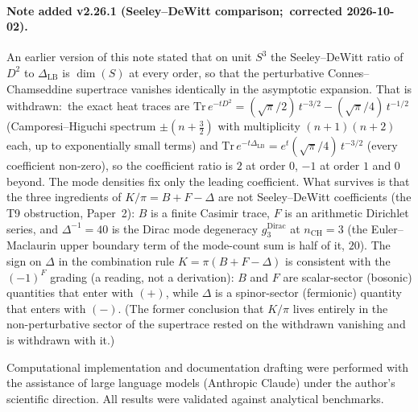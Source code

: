 \documentclass[aps,pra,twocolumn,superscriptaddress,longbibliography]{revtex4-2}
\begin{document}
\paragraph{Note added v2.26.1 (Seeley--DeWitt comparison;\ corrected
2026-10-02).}
An earlier version of this note stated that on unit $S^{3}$ the
Seeley--DeWitt ratio of $D^{2}$ to $\Delta_{\mathrm{LB}}$ is
$\dim(S)$ at every order, so that the perturbative Connes--Chamseddine
supertrace vanishes identically in the asymptotic expansion.  That is
withdrawn:\ the exact heat traces are
$\mathrm{Tr}\,e^{-tD^{2}} = (\sqrt\pi/2)\,t^{-3/2} - (\sqrt\pi/4)\,t^{-1/2}$
(Camporesi--Higuchi spectrum $\pm(n+\tfrac32)$ with multiplicity
$(n+1)(n+2)$ each, up to exponentially small terms) and
$\mathrm{Tr}\,e^{-t\Delta_{\mathrm{LB}}} = e^{t}(\sqrt\pi/4)\,t^{-3/2}$
(every coefficient non-zero), so the coefficient ratio is $2$ at order
$0$, $-1$ at order $1$ and $0$ beyond.  The mode densities fix only the
leading coefficient.  What survives is that the three
ingredients of $K/\pi = B + F - \Delta$ are not Seeley--DeWitt
coefficients (the T9 obstruction, Paper~2): $B$ is a finite Casimir trace, $F$ is an arithmetic
Dirichlet series, and $\Delta^{-1} = 40$ is the Dirac mode degeneracy
$g_3^{\mathrm{Dirac}}$ at $n_{\mathrm{CH}} = 3$ (the Euler--Maclaurin
upper boundary term of the mode-count sum is half of it, $20$).  The sign on $\Delta$ in the combination rule $K = \pi(B + F -
\Delta)$ is consistent with the $(-1)^{F}$ grading (a reading, not a
derivation): $B$ and $F$ are
scalar-sector (bosonic) quantities that enter with $(+)$, while
$\Delta$ is a spinor-sector (fermionic) quantity that enters with
$(-)$.  (The former conclusion that $K/\pi$ lives entirely in the
non-perturbative sector of the supertrace rested on the withdrawn
vanishing and is withdrawn with it.)

\begin{acknowledgments}
Computational implementation and documentation drafting were
performed with the assistance of large language models (Anthropic
Claude) under the author's scientific direction.  All results
were validated against analytical benchmarks.
\end{acknowledgments}


\end{document}
